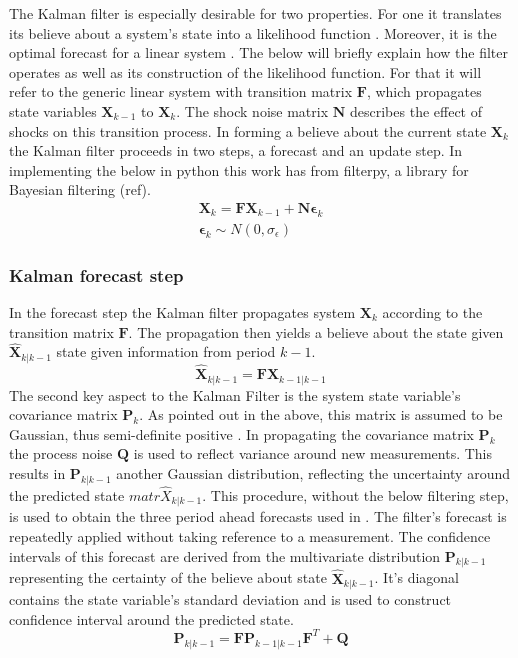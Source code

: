 \documentclass[12pt,a4paper,english]{article} %
\newcommand{\matr}[1]{\mathbf{#1}} %
\begin{document}
	The Kalman filter is especially desirable for two properties. For one it translates its believe about a system's state into a likelihood function \cite{kalman_new_1960}. Moreover, it is the optimal forecast for a linear system \cite{kalman_new_1960}. The below will briefly explain how the filter operates as well as its construction of the likelihood function. For that it will refer to the generic linear system with transition matrix $\matr{F}$, which propagates state variables $\matr{X}_{k-1}$ to $\matr{X}_k$. The shock noise matrix $\matr N$ describes the effect of shocks on this transition process. In forming a believe about the current state $\matr{X}_k$ the Kalman filter proceeds in two steps, a forecast and an update step. In implementing the below in python this work has from filterpy, a library for Bayesian filtering (ref).
	\begin{equation}
		\begin{aligned}
			\matr{X}_k = \matr F \matr{X}_{k-1} + \matr N \matr{\epsilon}_k \\
			\matr{\epsilon}_k \sim N(0, \sigma_{\epsilon})
		\end{aligned}
	\end{equation}
	
	\subsubsection{Kalman forecast step} \label{kalman_forecast_step}
	In the forecast step the Kalman filter propagates system $\matr X_{k}$ according to the transition matrix $\matr F$. The propagation then yields a believe about the state given $\matr{\hat{X}}_{k|k-1}$ state given information from period $k-1$.
	\[
		\matr{\hat{X}}_{k|k-1} = \matr F \matr X_{k-1|k-1}
	\]
	The second key aspect to the Kalman Filter is the system state variable's covariance matrix $\matr P_{k}$. As pointed out in the above, this matrix is assumed to be Gaussian, thus semi-definite positive \cite{andrews_kalman_2008}. In propagating the covariance matrix $\matr P_{k}$ the process noise $\matr Q$ is used to reflect variance around new measurements. This results in $\matr{P}_{k| k-1}$ another Gaussian distribution, reflecting the uncertainty around the predicted state $matr{\hat{X}}_{k|k-1}$.
	This procedure, without the below filtering step, is used to obtain the three period ahead forecasts used in . The filter's forecast is repeatedly applied without taking reference to a measurement. The confidence intervals of this forecast are derived from the multivariate distribution $\matr{P}_{k| k-1}$ representing the certainty of the believe about state $\matr{\hat{X}}_{k|k-1}$. It's diagonal contains the state variable's standard deviation and is used to construct confidence interval around the predicted state. 
	\[
		\matr{P}_{k| k-1} = \matr F \matr{P}_{k-1| k-1} \matr{F}^T + \matr Q
	\]
\end{document}
